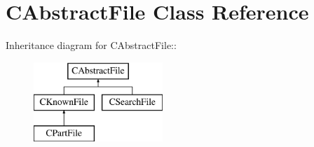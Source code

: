 \section{CAbstractFile Class Reference}
\label{classCAbstractFile}
Inheritance diagram for CAbstractFile::\begin{figure}[H]
\begin{center}
\leavevmode
\includegraphics[height=3cm]{classCAbstractFile}
\end{center}
\end{figure}
